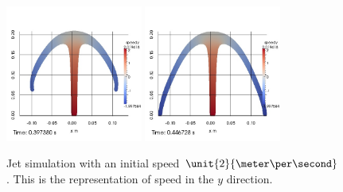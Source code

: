 \begin{figure}
\begin{center}
{}
\subcaptionbox{\label{top:jet:Gy:5}}
{
\includegraphics[width=0.4\textwidth]{topology/JetGrand/speedy0005.jpg}
}
\subcaptionbox{\label{top:jet:Gy:6}}
{
\includegraphics[width=0.4\textwidth]{topology/JetGrand/speedy0006.jpg}
}
\end{center}
\caption{Jet simulation with an initial speed $\unit{2}{\meter \per \second}$.
This is the representation of speed in the $y$ direction.}
\label{top:jet:Gy}
\end{figure}

